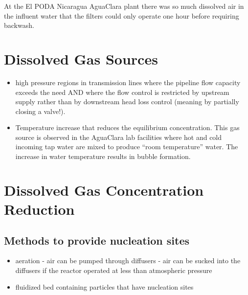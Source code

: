 \documentclass[letterpaper,10pt,english]{sphinxmanual}
\begin{document}
At the El PODA Nicaragua AguaClara plant there was so much dissolved air in the influent water that the filters could only operate one hour before requiring backwash.


\section{Dissolved Gas Sources}
\label{\detokenize{Dissolved_Gas/DG_Intro:dissolved-gas-sources}}\label{\detokenize{Dissolved_Gas/DG_Intro:heading-dissolved-gas-sources}}\begin{itemize}
\item {} 
high pressure regions in transmission lines where the pipeline flow capacity exceeds the need AND where the flow control is restricted by upstream supply rather than by downstream head loss control (meaning by partially closing a valve!).

\item {} 
Temperature increase that reduces the equilibrium concentration. This gas source is observed in the AguaClara lab facilities where hot and cold incoming tap water are mixed to produce “room temperature” water. The increase in water temperature results in bubble formation.

\end{itemize}


\section{Dissolved Gas Concentration Reduction}
\label{\detokenize{Dissolved_Gas/DG_Intro:dissolved-gas-concentration-reduction}}\label{\detokenize{Dissolved_Gas/DG_Intro:heading-dissolved-gas-concentration-reduction}}

\subsection{Methods to provide nucleation sites}
\label{\detokenize{Dissolved_Gas/DG_Intro:methods-to-provide-nucleation-sites}}\begin{itemize}
\item {} 
aeration
- air can be pumped through diffusers
- air can be sucked into the diffusers if the reactor operated at less than atmospheric pressure

\item {} 
fluidized bed containing particles that have nucleation sites

\end{itemize}
\end{document}
